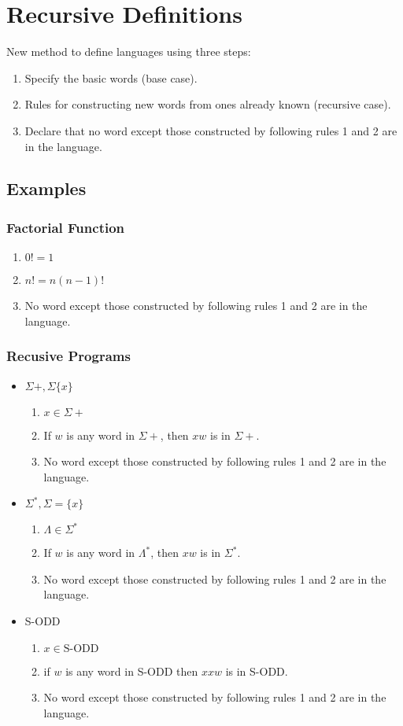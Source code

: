 \section{Recursive Definitions}
New method to define languages using three steps:
\begin{enumerate}
    \item Specify the basic words (base case).
    \item Rules for constructing new words from ones already known (recursive case).
    \item Declare that no word except those constructed by following rules 1 and 2 are in the language.
\end{enumerate}

\subsection{Examples}
\subsubsection{Factorial Function}
\begin{enumerate}
    \item \(0! = 1\)
    \item \(n!=n(n-1)!\)
    \item No word except those constructed by following rules 1 and 2 are in the language.
\end{enumerate}
\subsubsection{Recusive Programs}
\begin{itemize}
    \item \(\Sigma+,\Sigma\{x\}\)
    \begin{enumerate}
        \item \(x\in\Sigma+\)
        \item If \(w\) is any word in \(\Sigma+\), then \(xw\) is in \(\Sigma+\).
        \item No word except those constructed by following rules 1 and 2 are in the language.
    \end{enumerate}
    \item \(\Sigma^*, \Sigma=\{x\}\)
    \begin{enumerate}
        \item \(\Lambda \in \Sigma^*\)
        \item If \(w\) is any word in \(\Lambda^*\), then \(xw\) is in \(\Sigma^*\).
        \item No word except those constructed by following rules 1 and 2 are in the language.
    \end{enumerate}
    \item S-ODD
    \begin{enumerate}
        \item \(x\in\text{S-ODD}\)
        \item if \(w\) is any word in S-ODD then \(xxw\) is in S-ODD.
        \item No word except those constructed by following rules 1 and 2 are in the language.
    \end{enumerate}
\end{itemize}